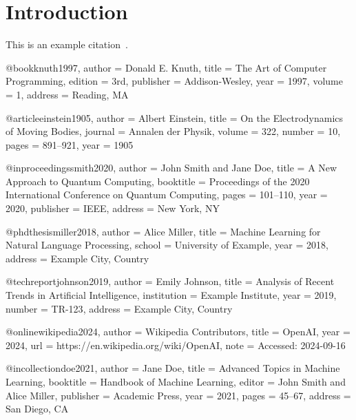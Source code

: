 
\usepackage[backend=biber, style=numeric]{biblatex}



\section{Introduction}
This is an example citation~\cite{einstein1905}.

\printbibliography[]



@book{knuth1997,
    author    = {Donald E. Knuth},
    title     = {The Art of Computer Programming},
    edition   = {3rd},
    publisher  = {Addison-Wesley},
    year      = {1997},
    volume    = {1},
    address   = {Reading, MA}
}

@article{einstein1905,
    author  = {Albert Einstein},
    title   = {On the Electrodynamics of Moving Bodies},
    journal = {Annalen der Physik},
    volume  = {322},
    number  = {10},
    pages   = {891--921},
    year    = {1905}
}

@inproceedings{smith2020,
    author    = {John Smith and Jane Doe},
    title     = {A New Approach to Quantum Computing},
    booktitle = {Proceedings of the 2020 International Conference on Quantum Computing},
    pages     = {101--110},
    year      = {2020},
    publisher = {IEEE},
    address   = {New York, NY}
}

@phdthesis{miller2018,
    author    = {Alice Miller},
    title     = {Machine Learning for Natural Language Processing},
    school    = {University of Example},
    year      = {2018},
    address   = {Example City, Country}
}

@techreport{johnson2019,
    author      = {Emily Johnson},
    title       = {Analysis of Recent Trends in Artificial Intelligence},
    institution = {Example Institute},
    year        = {2019},
    number      = {TR-123},
    address     = {Example City, Country}
}

@online{wikipedia2024,
    author    = {{Wikipedia Contributors}},
    title     = {OpenAI},
    year      = {2024},
    url       = {https://en.wikipedia.org/wiki/OpenAI},
    note      = {Accessed: 2024-09-16}
}

@incollection{doe2021,
    author    = {Jane Doe},
    title     = {Advanced Topics in Machine Learning},
    booktitle = {Handbook of Machine Learning},
    editor    = {John Smith and Alice Miller},
    publisher = {Academic Press},
    year      = {2021},
    pages     = {45--67},
    address   = {San Diego, CA}
}

